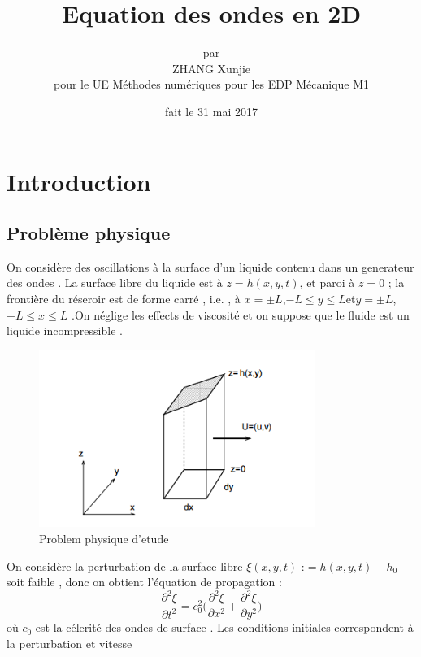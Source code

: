 \documentclass[a4paper,10pt]{report} %
\title{\textbf{Equation des ondes en 2D}} %
\author{par\\ZHANG Xunjie\\pour le UE Méthodes numériques pour les EDP Mécanique M1 } %
\date{fait le 31 mai 2017} %
\begin{document}
\maketitle %
\tableofcontents %
\listoffigures %
\chapter{Introduction} 
\section{Problème physique}
On considère des oscillations à la surface d'un liquide contenu dans un generateur des ondes . La surface libre du liquide est à $z=h(x,y,t)$, et paroi à $z=0$ ; la frontière du réseroir est de forme carré , i.e. , à $x=\pm L$,$-L\leq y\leq L$et$y=\pm L$,$-L\leq x\leq L$ .On néglige les effects de viscosité et on suppose que le fluide est un liquide incompressible . 
\begin{figure}[h]
\centering
\includegraphics[width=0.8\textwidth]{fig/figure1.png}
\caption{Problem physique d'etude}
\end{figure}

On considère la perturbation de la surface libre $\xi(x,y,t)$ :$=h(x,y,t)-h_0$ soit faible , donc on obtient l'équation de propagation :
\begin{equation}
\frac{\partial ^2\xi}{\partial t^2}=c_0^2\Big(\frac{\partial ^2\xi}{\partial x^2}+\frac{\partial ^2\xi}{\partial y^2}\Big)
\end{equation}
où $c_0$ est la célerité des ondes de surface . Les conditions initiales correspondent à la perturbation et vitesse 
\end{document}
